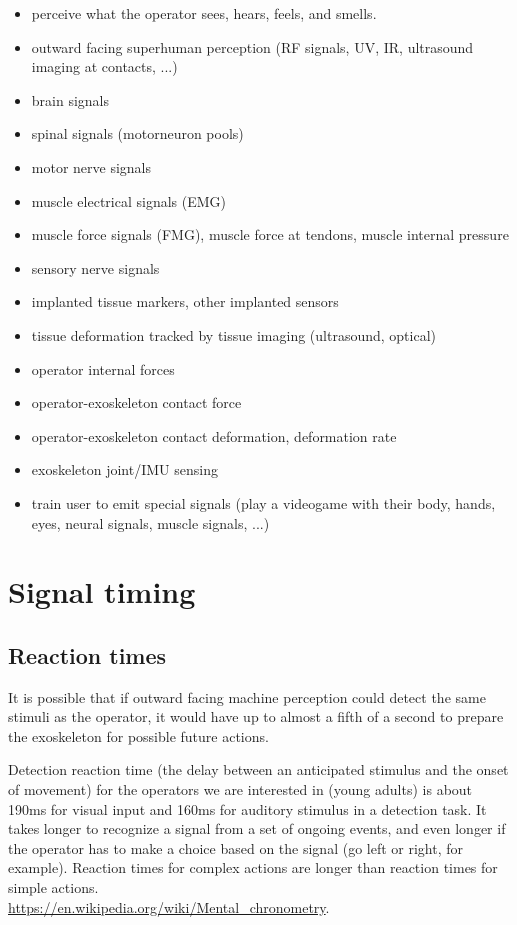 \documentclass[letterpaper,12pt,fullpage]{article}
\begin{document}
\begin{itemize}
\item
perceive what the operator sees, hears, feels, and smells.
\item
outward facing superhuman perception (RF signals, UV, IR, ultrasound
imaging at contacts, ...)
\item
brain signals
\item
spinal signals (motorneuron pools)
\item
motor nerve signals
\item
muscle electrical signals (EMG)
\item
muscle force signals (FMG), muscle force at tendons, muscle internal pressure
\item
sensory nerve signals
\item
implanted tissue markers, other implanted sensors
\item
tissue deformation tracked by tissue imaging (ultrasound, optical)
\item
operator internal forces
\item
operator-exoskeleton contact force
\item
operator-exoskeleton contact deformation, deformation rate
\item
exoskeleton joint/IMU sensing
\item
train user to emit special signals (play a videogame with their body,
hands, eyes, neural signals, muscle signals, ...)
\end{itemize}

\section{Signal timing}

\subsection{Reaction times}

It is possible that if outward facing machine perception could
detect the same stimuli as the operator,
it would have up to almost a fifth of a second
to prepare the exoskeleton for possible future actions.

Detection reaction time (the delay between an anticipated 
stimulus and the onset of movement) 
for the operators we are interested in (young adults)
is about
190ms for visual input and
160ms for auditory stimulus in a detection task.
It takes longer to recognize a signal from a set of ongoing events,
and even longer if the operator has to make a choice based on the signal
(go left or right, for example).
Reaction times for complex actions are longer than reaction times
for simple actions.\\
\url{https://en.wikipedia.org/wiki/Mental_chronometry}.
\end{document}
